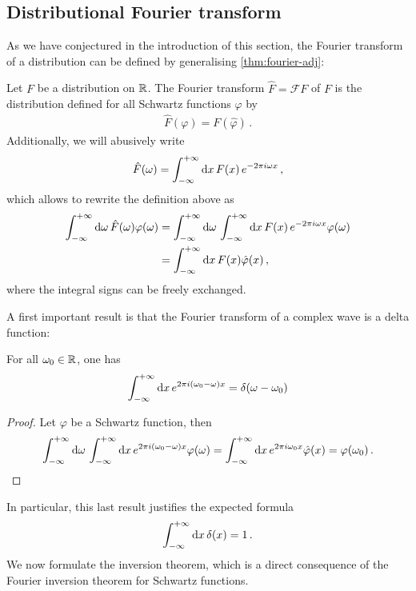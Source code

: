 \subsection{Distributional Fourier transform}
As we have conjectured in the introduction of this section, the Fourier transform of a
distribution can be defined by generalising \cref{thm:fourier-adj}:
\begin{definition}
  Let $F$ be a distribution on $\mathbb{R}$. The Fourier transform $\hat{F}=\mathcal{F}F$ of $F$
  is the distribution defined for all Schwartz functions $\varphi$ by
  \begin{align}
    \hat{F}(\varphi)=F(\hat{\varphi})\,.
  \end{align}
  Additionally, we will abusively write
  \begin{equation}
    \hat{F}(\omega)=\int_{-\infty}^{+\infty}\mathrm{d}{x}\,F(x)\,e^{-2\pi i \omega x}\,,
  \end{equation}
  which allows to rewrite the definition above as
  \begin{align}
    \int_{-\infty}^{+\infty}\mathrm{d}{\omega}\,\hat{F}(\omega)\varphi(\omega)&=\int_{-\infty}^{+\infty}\mathrm{d}{\omega}\,
    \int_{-\infty}^{+\infty}\mathrm{d}{x}\,F(x)\,e^{-2\pi i \omega x}\varphi(\omega)\notag\\
    &=\int_{-\infty}^{+\infty}\mathrm{d}{x}\,F(x)\hat{\varphi}(x)\,,
    \label{eq:fourier-adj-dist}
  \end{align}
  where the integral signs can be freely exchanged.
\end{definition}
A first important result is that the Fourier transform of a complex wave is a delta
function:
\begin{proposition}
  For all $\omega_0\in\mathbb{R}$, one has
  \begin{equation}
    \int_{-\infty}^{+\infty}\mathrm{d}{x}\,e^{2\pi i (\omega_0-\omega)x}=\delta(\omega-\omega_0)
  \end{equation}
\end{proposition}
\begin{proof}
  Let $\varphi$ be a Schwartz function, then
  \begin{equation}
    \int_{-\infty}^{+\infty}\mathrm{d}{\omega}\,\int_{-\infty}^{+\infty}\mathrm{d}{x}\,e^{2\pi i (\omega_0-\omega)x}\varphi(\omega)=
    \int_{-\infty}^{+\infty}\mathrm{d}{x}\,e^{2\pi i\omega_0x}\hat{\varphi}(x)=\varphi(\omega_0)\,.
  \end{equation}
\end{proof}
In particular, this last result justifies the expected formula
\begin{equation}
  \int_{-\infty}^{+\infty}\mathrm{d}{x}\,\delta(x)=1\,.
\end{equation}
We now formulate the inversion theorem, which is a direct consequence of the Fourier
inversion theorem for Schwartz functions.

